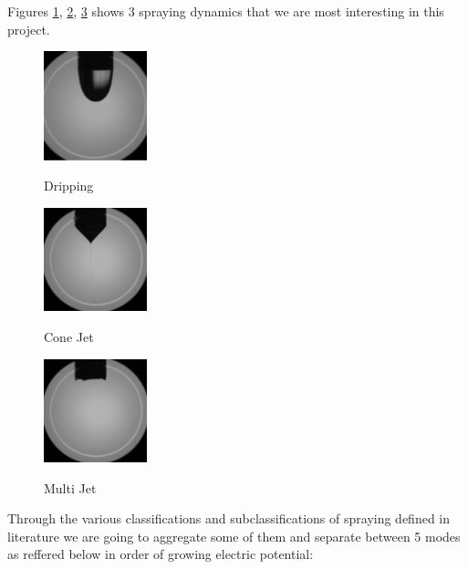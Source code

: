 Figures \ref{fig:dripping_camera_example}, \ref{fig:cone_camera_jet_example}, \ref{fig:multi_camera_jet_example} shows 3 spraying dynamics that we are most interesting in this project. 

\begin{multicols}{3}

  \begin{figure}[H]
      \center
      \includegraphics[width=3cm]{Figuras/drippingexample.png}
      \label{fig:dripping_camera_example}
      \caption{Dripping}
  \end{figure}


  \begin{figure}[H]
      \center
      \includegraphics[width=3cm]{Figuras/conejetexample.png}
      \label{fig:cone_camera_jet_example}
      \caption{Cone Jet}
  \end{figure}


  \begin{figure}[H]
      \center
      \includegraphics[width=3cm]{Figuras/multijetexample.png}
      \label{fig:multi_camera_jet_example}
      \caption{Multi Jet}
  \end{figure}

\end{multicols}


Through the various classifications and subclassifications of spraying defined in literature we are going to aggregate some of them and separate between 5 modes as reffered below in order of growing electric potential:


